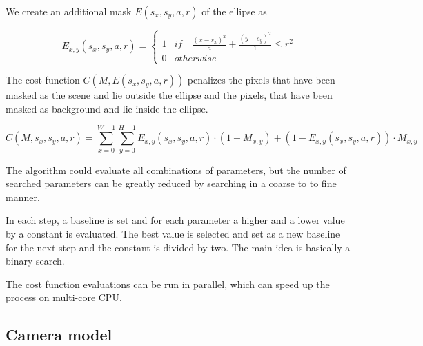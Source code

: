 \documentclass[a4paper,12pt,titlepage]{article}
\numberwithin{figure}{section}
\begin{document}
We create an additional mask $E(s_x, s_y, a, r)$ of the ellipse as 

\begin{equation*}
E_{x,y}(s_x, s_y, a, r) = \begin{cases}
1 & if \quad \frac{(x-s_x)^2}{a} + \frac{(y-s_y)^2}{1} \leq r^2 \\
0 & otherwise
\end{cases}
\end{equation*}

The cost function $C(M, E(s_x, s_y, a, r))$ penalizes the pixels that have been masked as the scene and lie outside the ellipse and the pixels, that have been masked as background and lie inside the ellipse.

\begin{equation}
C(M, s_x, s_y, a, r) = \sum_{x = 0}^{W-1} \sum_{y = 0}^{H-1} E_{x,y}(s_x, s_y, a, r) \cdot (1-M_{x,y}) + (1 - E_{x,y}(s_x, s_y, a, r)) \cdot M_{x,y}
\end{equation}

The algorithm could evaluate all combinations of parameters, but the number of searched parameters can be greatly reduced by searching in a coarse to to fine manner. 

In each step, a baseline is set and for each parameter a higher and a lower value by a constant is evaluated. The best value is selected and set as a new baseline for the next step and the constant is divided by two. The main idea is basically a binary search.


%
%
%    
%    
%    

The cost function evaluations can be run in parallel, which can speed up the process on multi-core CPU.

\subsection{Camera model}
\end{document}
